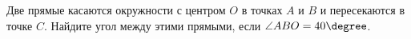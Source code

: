 \begin{ex}
	\begin{condition}
		Две прямые касаются окружности с центром \( O \) в точках \( A  \) и \( B  \) и пересекаются в точке \( C \). Найдите угол между этими прямыми, если \( \angle ABO = 40\degree \).
	\end{condition}
\end{ex}
